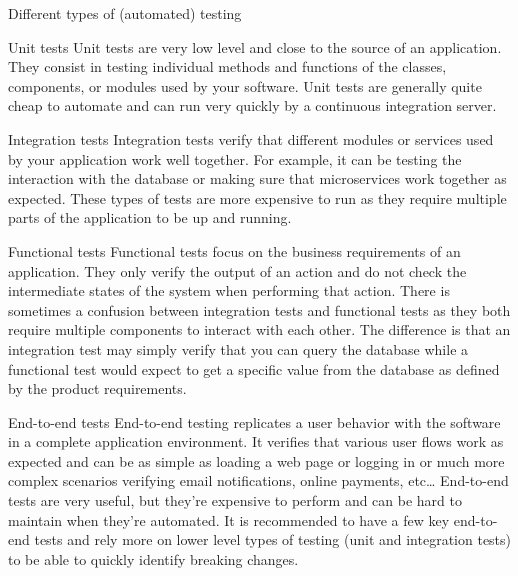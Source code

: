 \begin{frame}{Different types of (automated) testing}
\protect{}\label{different-types-of-automated-testing}
\begin{block}{Unit tests}
\protect{}\label{unit-tests}
Unit tests are very low level and close to the source of an application.
They consist in testing individual methods and functions of the classes,
components, or modules used by your software. Unit tests are generally
quite cheap to automate and can run very quickly by a continuous
integration server.
\end{block}

\begin{block}{Integration tests}
\protect{}\label{integration-tests}
Integration tests verify that different modules or services used by your
application work well together. For example, it can be testing the
interaction with the database or making sure that microservices work
together as expected. These types of tests are more expensive to run as
they require multiple parts of the application to be up and running.
\end{block}

\begin{block}{Functional tests}
\protect{}\label{functional-tests}
Functional tests focus on the business requirements of an application.
They only verify the output of an action and do not check the
intermediate states of the system when performing that action. There is
sometimes a confusion between integration tests and functional tests as
they both require multiple components to interact with each other. The
difference is that an integration test may simply verify that you can
query the database while a functional test would expect to get a
specific value from the database as defined by the product requirements.
\end{block}

\begin{block}{End-to-end tests}
\protect{}\label{end-to-end-tests}
End-to-end testing replicates a user behavior with the software in a
complete application environment. It verifies that various user flows
work as expected and can be as simple as loading a web page or logging
in or much more complex scenarios verifying email notifications, online
payments, etc\ldots{} End-to-end tests are very useful, but they're
expensive to perform and can be hard to maintain when they're automated.
It is recommended to have a few key end-to-end tests and rely more on
lower level types of testing (unit and integration tests) to be able to
quickly identify breaking changes.
\end{block}


\end{frame}
